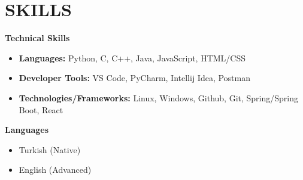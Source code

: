 \section{SKILLS}

\begin{itemize}[
  itemsep=0pt,
  parsep=5pt,
  label={},
  leftmargin=0pt
]
  \begin{minipage}[t]{0.5\linewidth}
    \item \textbf{Technical Skills}
    \begin{itemize}[
      leftmargin=0.25in,
      itemsep=1pt
    ]
      \item \textbf{Languages:} Python, C, C++, Java, JavaScript, HTML/CSS
      \item \textbf{Developer Tools:} VS Code, PyCharm, Intellij Idea, Postman
      \item \textbf{Technologies/Frameworks:} Linux, Windows, Github, Git, Spring/Spring Boot, React
    \end{itemize}
  \end{minipage}
  \hspace*{0.05\linewidth}
  \begin{minipage}[t]{0.4\linewidth}
    \item \textbf{Languages}
      \begin{itemize}[
        leftmargin=0.25in,
        itemsep=1pt
      ]
        \item Turkish (Native)
        \item English (Advanced)
      \end{itemize}
  \end{minipage}
\end{itemize}
  